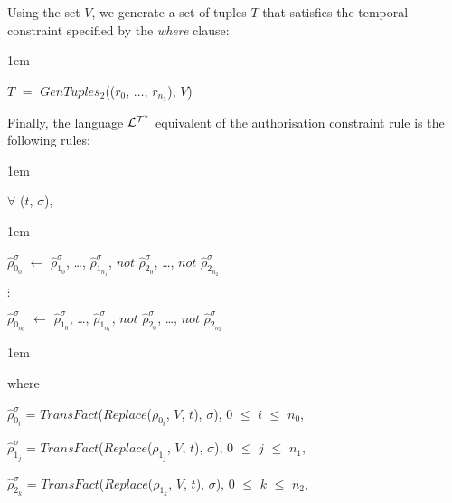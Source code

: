 \documentclass[11pt]{report}
\newenvironment{vquote}
{
  \begin{list}{}{\leftmargin 1em}\item[]
}
{
  \end{list}
}
\begin{document}
\begin{itemize}
              \noindent
              Using the set $V$, we generate a set of tuples $T$ that satisfies
              the temporal constraint specified by the {\em where} clause:

              \begin{vquote}
                $T$ $=$ $GenTuples_2$(($r_0$, $\ldots$, $r_{n_3}$), $V$)
              \end{vquote}

              \noindent
              Finally, the language ${\cal L^{T^*}}$ equivalent of the
              authorisation constraint rule is the following rules:

              \begin{vquote}
                $\forall$ ($t$, $\sigma$),
              \end{vquote}

              \begin{vquote}
                $\hat{\rho}^{\sigma}_{0_0}$ $\leftarrow$
                $\hat{\rho}^{\sigma}_{1_0}$, \ldots, $\hat{\rho}^{\sigma}_{1_{n_1}}$,
                $not$ $\hat{\rho}^{\sigma}_{2_0}$, \ldots, $not$ $\hat{\rho}^{\sigma}_{2_{n_2}}$

                $\vdots$

                $\hat{\rho}^{\sigma}_{0_{n_0}}$ $\leftarrow$
                $\hat{\rho}^{\sigma}_{1_0}$, \ldots, $\hat{\rho}^{\sigma}_{1_{n_1}}$,
                $not$ $\hat{\rho}^{\sigma}_{2_0}$, \ldots, $not$ $\hat{\rho}^{\sigma}_{2_{n_2}}$
              \end{vquote}

              \begin{vquote}
                where

                \hspace{1em}
                $\hat{\rho}^{\sigma}_{0_i}$ =
                $TransFact$($Replace$($\rho_{0_i}$, $V$, $t$), $\sigma$),
                $0$ $\leq$ $i$ $\leq$ $n_0$,

                \hspace{1em}
                $\hat{\rho}^{\sigma}_{1_j}$ =
                $TransFact$($Replace$($\rho_{1_j}$, $V$, $t$), $\sigma$),
                $0$ $\leq$ $j$ $\leq$ $n_1$,

                \hspace{1em}
                $\hat{\rho}^{\sigma}_{2_k}$ =
                $TransFact$($Replace$($\rho_{1_k}$, $V$, $t$), $\sigma$),
                $0$ $\leq$ $k$ $\leq$ $n_2$,


\end{vquote}
\end{itemize}
\end{document}
